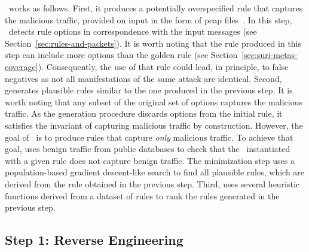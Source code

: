 \documentclass[sigconf,review, anonymous]{acmart}
\begin{document}
\tname\ works as follows. First, it produces a potentially
overspecified rule that captures the malicious traffic, provided on
input in the form of pcap files~\cite{pcap}. In this step,
\tname\ detects rule options in correspondence with the input messages
(see Section~\ref{sec:rules-and-packets}). It is worth noting that the
rule produced in this step can include more options than the golden
rule (see Section~\ref{sec:suri-metas-coverage}). Consequently, the
use of that rule could lead, in principle, to false negatives as not
all manifestations of the same attack are identical. Second, \tname{}
generates plausible rules similar to the one produced in the previous
step. It is worth noting that any subset of the original set of
options captures the malicious traffic. As the generation procedure
discards options from the initial rule, it satisfies the invariant of
capturing malicious traffic by construction. However, the goal of
\tname\ is to produce rules that capture \emph{only} malicious
traffic. To achieve that goal, \tname{} uses benign traffic from
public databases to check that the \nids\ instantiated with a given
rule does not capture benign traffic. The minimization step uses a
population-based gradient descent-like search to find all plausible
rules, which are derived from the rule obtained in the previous
step. Third, uses several heuristic functions derived from a dataset
of rules to rank the rules generated in the previous step.






\subsection{Step 1: Reverse Engineering}
\end{document}
